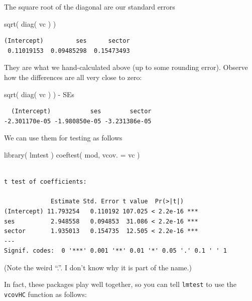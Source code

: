 \documentclass[
  letterpaper,
  DIV=11,
  numbers=noendperiod]{scrreprt}
\newenvironment{Shaded}{\begin{snugshade}}{\end{snugshade}}
\newcommand{\AttributeTok}[1]{\textcolor[rgb]{0.49,0.56,0.16}{#1}}
\newcommand{\FunctionTok}[1]{\textcolor[rgb]{0.02,0.16,0.49}{#1}}
\newcommand{\NormalTok}[1]{\textcolor[rgb]{0.00,0.44,0.13}{#1}}
\newcommand{\SpecialCharTok}[1]{\textcolor[rgb]{0.25,0.44,0.63}{#1}}
\begin{document}
The square root of the diagonal are our standard errors

\begin{Shaded}
\begin{Highlighting}[]
\FunctionTok{sqrt}\NormalTok{( }\FunctionTok{diag}\NormalTok{( vc ) )}
\end{Highlighting}
\end{Shaded}

\begin{verbatim}
(Intercept)         ses      sector 
 0.11019153  0.09485298  0.15473493 
\end{verbatim}

They are what we hand-calculated above (up to some rounding error).
Observe how the differences are all very close to zero:

\begin{Shaded}
\begin{Highlighting}[]
\FunctionTok{sqrt}\NormalTok{( }\FunctionTok{diag}\NormalTok{( vc ) ) }\SpecialCharTok{{-}}\NormalTok{ SEs}
\end{Highlighting}
\end{Shaded}

\begin{verbatim}
  (Intercept)           ses        sector 
-2.301170e-05 -1.980850e-05 -3.231386e-05 
\end{verbatim}

We can use them for testing as follows

\begin{Shaded}
\begin{Highlighting}[]
\FunctionTok{library}\NormalTok{( lmtest )}
\FunctionTok{coeftest}\NormalTok{( mod, }\AttributeTok{vcov. =}\NormalTok{ vc )}
\end{Highlighting}
\end{Shaded}

\begin{verbatim}

t test of coefficients:

             Estimate Std. Error t value  Pr(>|t|)    
(Intercept) 11.793254   0.110192 107.025 < 2.2e-16 ***
ses          2.948558   0.094853  31.086 < 2.2e-16 ***
sector       1.935013   0.154735  12.505 < 2.2e-16 ***
---
Signif. codes:  0 '***' 0.001 '**' 0.01 '*' 0.05 '.' 0.1 ' ' 1
\end{verbatim}

(Note the weird ``.''. I don't know why it is part of the name.)

In fact, these packages play well together, so you can tell
\texttt{lmtest} to use the \texttt{vcovHC} function as follows:
\end{document}
